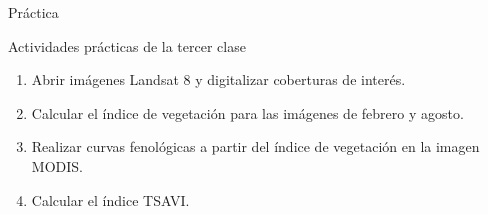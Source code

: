 \documentclass[]{beamer}
\begin{document}
\begin{frame}{Práctica}
  \begin{exampleblock}{Actividades prácticas de la tercer clase}
    \begin{enumerate}
      \item Abrir imágenes Landsat 8 y digitalizar coberturas de interés.
      \item Calcular el índice de vegetación para las imágenes de febrero y agosto.
      \item Realizar curvas fenológicas a partir del índice de
          vegetación en la imagen MODIS\@.
      \item Calcular el índice TSAVI\@.
    \end{enumerate}
  \end{exampleblock}
\end{frame}
\end{document}
